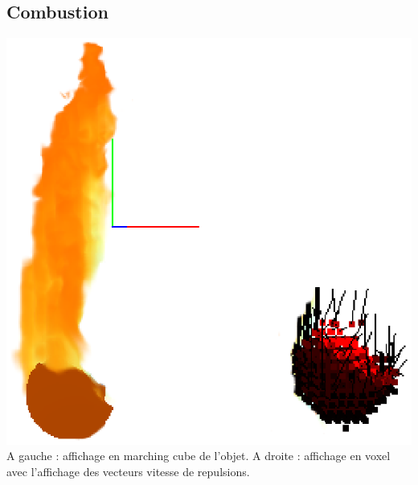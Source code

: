 \documentclass[a4paper,10pt]{article}
\begin{document}
\subsection{Combustion}

    \begin{center}
	\includegraphics[scale=1]{Decomposition.ps}\\
	A gauche : affichage en marching cube de l'objet. A droite : affichage en voxel avec l'affichage des vecteurs vitesse de repulsions.\\
    \end{center}
    
\end{document}
